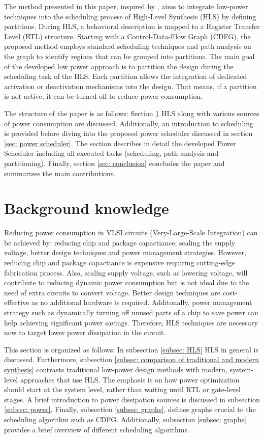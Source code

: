 \documentclass[conference]{IEEEtran}
\begin{document}
The method presented in this paper, inspired by \cite{Ret}, aims to integrate low-power techniques into the scheduling process of High-Level Synthesis (HLS) by defining partitions. During HLS, a behavioral description is mapped to a Register Transfer Level (RTL) structure. Starting with a Control-Data-Flow Graph (CDFG), the proposed method employs standard scheduling techniques and path analysis on the graph to identify regions that can be grouped into partitions. The main goal of the developed low power approach is to partition the design during the scheduling task of the HLS. Each partition allows the integration of dedicated activation or deactivation mechanisms into the design. That means, if a partition is not active, it can be turned off to reduce power consumption.


The structure of the paper is as follows: Section \ref{sec: fundamentals} HLS along with various sources of power consumption are discussed. Additionally, an introduction to scheduling is provided before diving into the proposed power scheduler discussed in section \ref{sec: power scheduler}. The section describes in detail the developed Power Scheduler including all executed tasks (scheduling, path analysis and partitioning). Finally, section \ref{sec: conclusion} concludes the paper and summarizes the main contributions. 



\section{Background knowledge}
\label{sec: fundamentals}
Reducing power consumption in VLSI circuits (Very-Large-Scale Integration) can be achieved by: reducing chip and package capactiance, scaling the supply voltage, better design techniques and power management strategies. However, reducing chip and package capactiance is expensive requiring cutting-edge fabrication process. Also, scaling supply voltage, such as lowering voltage, will contribute to reducing dynamic power consumption but is not ideal due to the need of extra circuits to convert voltage. Better design techniques are cost-effective as no additional hardware is required. Additonally, power management strategy such as dynamically turning off unused parts of a chip to save power can help achieving significant power savings. Therefore, HLS techniques are necessary now to target lower power dissipation in the circuit.

This section is organized as follows: In subsection \ref{subsec: HLS} HLS in general is discussed. Furthermore, subsection \ref{subsec: comparison of traditional and modern synthesis} contrasts traditional low-power design methods with modern, system-level approaches that use HLS. The emphasis is on how power optimization should start at the system level, rather than waiting until RTL or gate-level stages. A brief introduction to power dissipation sources is discussed in subsection \ref{subsec: power}. Finally, subsection \ref{subsec: graphs}, defines graphs crucial to the scheduling algorithm such as CDFG. Additionally, subsection \ref{subsec: graphs} provides a brief overview of different scheduling algorithms.
\end{document}
